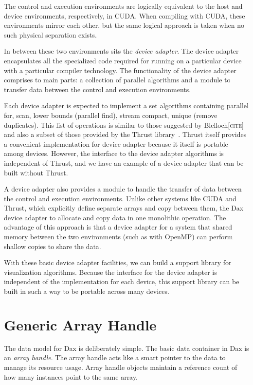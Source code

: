 \documentclass[conference]{IEEEtran}
\newcommand*{\lcite}[1]{~\cite{#1}}
\newcommand*{\keyterm}[1]{\emph{#1}}
\newcommand{\fix}[1]{{\color{red}\textsc{[#1]}}}
\begin{document}
The control and execution environments are logically equivalent to the host
and device environments, respectively, in CUDA.  When compiling with CUDA,
these environments mirror each other, but the same logical approach is
taken when no such physical separation exists.

In between these two environments sits the \keyterm{device adapter}.  The
device adapter encapsulates all the specialized code required for running
on a particular device with a particular compiler technology.  The
functionality of the device adapter comprises to main parts: a collection
of parallel algorithms and a module to transfer data between the control
and execution environments.

Each device adapter is expected to implement a set algorithms containing
parallel for, scan, lower bounds (parallel find), stream compact, unique
(remove duplicates).  This list of operations is similar to those suggested
by Blelloch\fix{cite} and also a subset of those provided by the Thrust
library\lcite{Thrust}.  Thrust itself provides a convenient implementation
for device adapter because it itself is portable among devices.  However,
the interface to the device adapter algorithms is independent of Thrust,
and we have an example of a device adapter that can be built without
Thrust.

A device adapter also provides a module to handle the transfer of data
between the control and execution environments.  Unlike other systems like
CUDA and Thrust, which explicitly define separate arrays and copy between
them, the Dax device adapter to allocate and copy data in one monolithic
operation.  The advantage of this approach is that a device adapter for a
system that shared memory between the two environments (such as with
OpenMP) can perform shallow copies to share the data.

With these basic device adapter facilities, we can build a support library
for visualization algorithms.  Because the interface for the device adapter
is independent of the implementation for each device, this support library
can be built in such a way to be portable across many devices.

\section{Generic Array Handle}
\label{sec:GenericArrayHandle}

\noindent
The data model for Dax is deliberately simple.  The basic data container in
Dax is an \keyterm{array handle}.  The array handle acts like a smart
pointer to the data to manage its resource usage.  Array handle objects
maintain a reference count of how many instances point to the same array.
\end{document}
